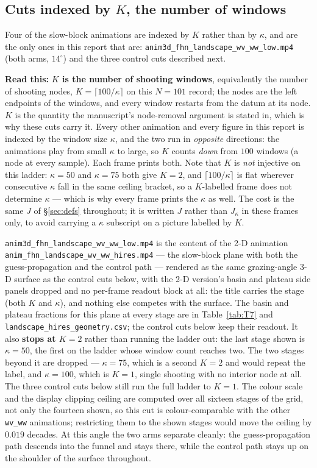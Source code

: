\documentclass[10pt]{article}
\newcommand{\readthis}[1]{\textbf{Read this:} #1}
\begin{document}
\subsection{Cuts indexed by $K$, the number of windows}\label{sec:Kcuts}
Four of the slow-block animations are indexed by $K$ rather than by $\kappa$, and are the only ones in this
report that are: \texttt{anim3d\_fhn\_landscape\_wv\_ww\_low.mp4} (both arms, $14^\circ$) and the three
control cuts described next.

\readthis{\textbf{$K$ is the number of shooting windows}, equivalently the number of shooting nodes,
$K=\lceil 100/\kappa\rceil$ on this $N=101$ record; the nodes are the left endpoints of the windows, and
every window restarts from the datum at its node. $K$ is the quantity the manuscript's node-removal argument
is stated in, which is why these cuts carry it. Every other animation and every figure in this report is
indexed by the window size $\kappa$, and the two run in \emph{opposite} directions: the animations play
from small $\kappa$ to large, so $K$ counts \emph{down} from $100$ windows (a node at every sample). Each
frame prints both. Note that $K$ is \emph{not} injective on this ladder: $\kappa=50$ and $\kappa=75$ both
give $K=2$, and $\lceil 100/\kappa\rceil$ is flat wherever consecutive $\kappa$ fall in the same ceiling
bracket, so a $K$-labelled frame does not determine $\kappa$ --- which is why every frame prints the
$\kappa$ as well. The cost is the same $J$ of \S\ref{sec:defs}
throughout; it is written $J$ rather than $J_\kappa$ in these frames only, to avoid carrying a $\kappa$
subscript on a picture labelled by $K$.}

\texttt{anim3d\_fhn\_landscape\_wv\_ww\_low.mp4} is the content of the 2-D animation
\texttt{anim\_fhn\_landscape\_wv\_ww\_hires.mp4} --- the slow-block plane with both the guess-propagation
and the control path --- rendered as the same grazing-angle 3-D surface as the control cuts below, with the
2-D version's basin and plateau side panels dropped and no per-frame readout block at all: the title carries
the stage (both $K$ and $\kappa$), and nothing else competes with the surface. The basin and plateau
fractions for this plane at every stage are in Table~\ref{tab:T7} and
\texttt{landscape\_hires\_geometry.csv}; the control cuts below keep their readout.
It also \textbf{stops at $K=2$} rather than running the ladder out: the last stage shown is $\kappa=50$, the
first on the ladder whose window count reaches two. The two stages beyond it are dropped --- $\kappa=75$,
which is a second $K=2$ and would repeat the label, and $\kappa=100$, which is $K=1$, single shooting with no
interior node at all. The three control cuts below still run the full ladder to $K=1$. The colour scale and
the display clipping ceiling are computed over all sixteen stages of the grid, not only the fourteen shown,
so this cut is colour-comparable with the other \texttt{wv\_ww} animations; restricting them to the shown
stages would move the ceiling by $0.019$ decades.
At this angle the two arms separate cleanly: the guess-propagation path descends into the funnel and stays
there, while the control path stays up on the shoulder of the surface throughout.
\end{document}
